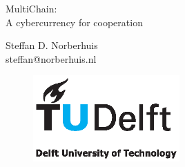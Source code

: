 \begin{titlepage}

\null\vfill

\begin{center}
\LARGE{MultiChain:\\
       		A cybercurrency for cooperation}
\end{center}

\vspace{1.5cm}

\begin{center}
Steffan D. Norberhuis\\
steffan@norberhuis.nl
\end{center}

\vfill

\begin{figure}[!b]
\centering
\includegraphics[width={0.5\textwidth}]{pics/TUD_logo_color.eps}
\end{figure}

\vspace{2.0cm}

\end{titlepage}
